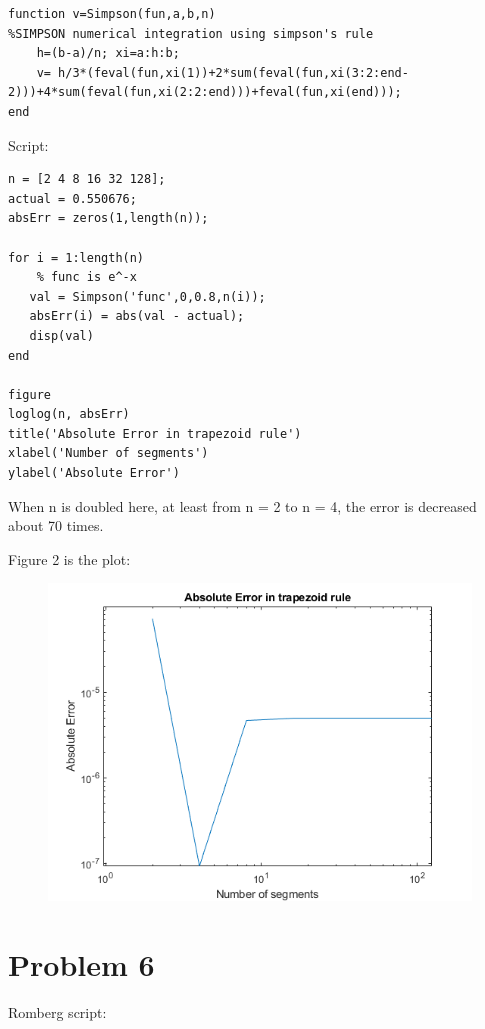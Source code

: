 \documentclass[]{article}
\begin{document}
\begin{verbatim}
function v=Simpson(fun,a,b,n)
%SIMPSON numerical integration using simpson's rule
    h=(b-a)/n; xi=a:h:b;
    v= h/3*(feval(fun,xi(1))+2*sum(feval(fun,xi(3:2:end-2)))+4*sum(feval(fun,xi(2:2:end)))+feval(fun,xi(end)));
end
\end{verbatim}

Script:

\begin{verbatim}
n = [2 4 8 16 32 128];
actual = 0.550676;
absErr = zeros(1,length(n));

for i = 1:length(n)
    % func is e^-x
   val = Simpson('func',0,0.8,n(i));
   absErr(i) = abs(val - actual);
   disp(val)
end

figure
loglog(n, absErr)
title('Absolute Error in trapezoid rule')
xlabel('Number of segments')
ylabel('Absolute Error')
\end{verbatim}

When n is doubled here, at least from n = 2 to n = 4, the error is
decreased about 70 times.

Figure 2 is the plot:

\begin{figure}
\centering
\includegraphics{./ch4prob5.png}
\caption{}
\end{figure}

\section{Problem 6}\label{problem-6}

Romberg script:
\end{document}
